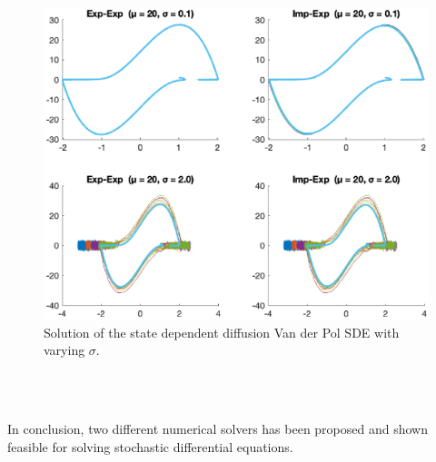 \begin{figure}[htb]
    \centering
    \includegraphics[width=\textwidth]{plots/4c.eps}
    \caption{Solution of the state dependent diffusion Van der Pol SDE with varying $\sigma$.}
    \label{fig:4c}
\end{figure}

\\\

In conclusion, two different numerical solvers has been proposed and shown feasible for solving stochastic differential equations.